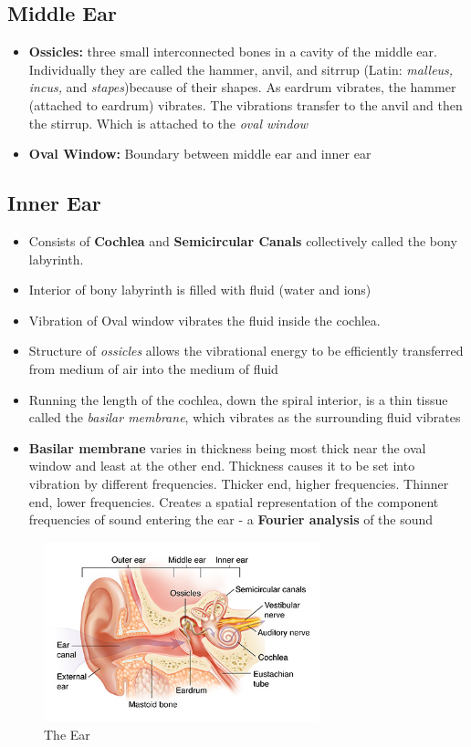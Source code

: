 \documentclass{article}
\begin{document}
\subsection{Middle Ear}
\begin{itemize}
    \item \textbf{Ossicles:} three small interconnected bones in a cavity of the middle ear. 
        \subitem Individually they are called the hammer, anvil, and sitrrup (Latin: \textit{malleus, incus,} and \textit{stapes})because of their shapes. 
        As eardrum vibrates, the hammer (attached to eardrum) vibrates. The vibrations transfer to the anvil and then the stirrup. Which is attached to the \textit{oval window}
    \item \textbf{Oval Window:} Boundary between middle ear and inner ear
\end{itemize}

\subsection{Inner Ear}
\begin{itemize}
    \item Consists of \textbf{Cochlea} and \textbf{Semicircular Canals} collectively called the bony labyrinth. 
    \item Interior of bony labyrinth is filled with fluid (water and ions) 
    \item Vibration of Oval window vibrates the fluid inside the cochlea. 
    \item Structure of \textit{ossicles} allows the vibrational energy to be efficiently transferred from medium of air into the medium of fluid
    \item Running the length of the cochlea, down the spiral interior, is a thin tissue called the \textit{basilar membrane}, which vibrates as the surrounding fluid vibrates
    \item \textbf{Basilar membrane} varies in thickness being most thick near the oval window and least at the other end. Thickness causes it to be set into vibration by different frequencies. Thicker end, higher frequencies. Thinner end, lower frequencies. 
    \subitem Creates a spatial representation of the component frequencies of sound entering the ear - a \textbf{Fourier analysis} of the sound
\end{itemize}

\begin{figure}[htp]
\centering
\includegraphics[width=8cm]{images/ear.png}
\caption{The Ear}
\label{fig: Ear}
\end{figure}
\end{document}
